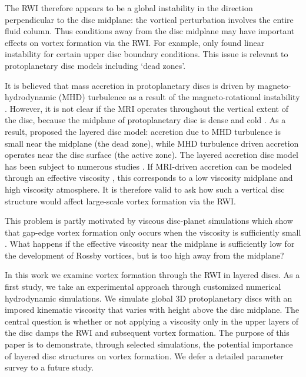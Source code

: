 \documentclass[useAMS,usenatbib]{mn2e}
\begin{document}
The RWI therefore appears to be a global instability in the direction
perpendicular to the disc midplane: the vortical perturbation involves
the entire fluid column. Thus conditions away
from the disc midplane may have important effects on vortex formation
via the RWI. For example, \cite{lin13a} only found linear
instability for certain upper disc boundary conditions. This issue is
relevant to protoplanetary disc models including `dead zones'.   

It is believed that mass accretion in protoplanetary discs is driven by
magneto-hydrodynamic (MHD) turbulence as a result of the
magneto-rotational instability \citep[MRI,][]{balbus91,balbus98}. However, it
is not clear if the MRI operates throughout the vertical extent of the
disc, because the midplane of protoplanetary 
disc is dense and cold \citep{armitage11}. As a result, \cite{gammie96}
proposed the layered disc model: accretion due to MHD turbulence
is small near the midplane (the dead zone), while MHD turbulence
driven accretion 
operates near the disc surface (the active zone). The layered
accretion disc model has been subject to numerous studies 
\citep[e.g.,][]{fleming03,terquem08,oishi09,dzy10,kretke10,okuzumi11,flaig11,landry13}.      
If MRI-driven accretion can be modeled through an effective 
viscosity \citep{balbus99}, this corresponds to a low viscosity midplane and 
high viscosity atmosphere. It is therefore valid to ask how such a
vertical disc structure would affect large-scale vortex formation via
the RWI.  

This problem is partly motivated by viscous disc-planet
simulations which show that  gap-edge vortex formation only
occurs when the viscosity is sufficiently small
\citep{valborro06,valborro07,edgar08}. %
What happens if the effective viscosity near the midplane is
sufficiently low for the development of Rossby vortices, 
but is too high away from the midplane? 

In this work we examine vortex formation through the RWI in
layered discs. As a first study, we take an
experimental approach through customized numerical hydrodynamic
simulations. We simulate global 3D protoplanetary discs with an imposed
kinematic viscosity that varies with height above the disc
midplane. %
The central question is whether or not applying a viscosity only in the upper
layers of the disc damps the RWI and subsequent vortex formation.   
The purpose of this paper is to demonstrate, through selected 
simulations, the potential importance of layered disc structures on
vortex formation. We defer a detailed parameter survey to a future
study.  
\end{document}
